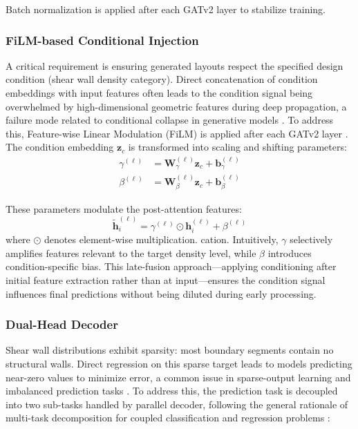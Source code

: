 Batch normalization is applied after each GATv2 layer to stabilize training.

\subsubsection{FiLM-based Conditional Injection}

A critical requirement is ensuring generated layouts respect the specified design condition (shear wall density category).
Direct concatenation of condition embeddings with input features often leads to the condition signal being overwhelmed by high-dimensional geometric features during deep propagation, a failure mode related to conditional collapse in generative models \cite{lucasUnderstandingPosteriorCollapse2019}. To address this, Feature-wise Linear Modulation (FiLM) is applied after each GATv2 layer \cite{perezFiLMVisualReasoning2018}.
The condition embedding $\mathbf{z}_c$ is transformed into scaling and shifting parameters:
\begin{align}
\gamma^{(\ell)} &= \mathbf{W}_\gamma^{(\ell)} \mathbf{z}_c + \mathbf{b}_\gamma^{(\ell)} \\
\beta^{(\ell)} &= \mathbf{W}_\beta^{(\ell)} \mathbf{z}_c + \mathbf{b}_\beta^{(\ell)}
\end{align}

These parameters modulate the post-attention features:
\begin{equation}
\tilde{\mathbf{h}}_i^{(\ell)} = \gamma^{(\ell)} \odot \mathbf{h}_i^{(\ell)} + \beta^{(\ell)}
\label{eq:method_film}
\end{equation}
where $\odot$ denotes element-wise multiplication.
cation.
Intuitively, $\gamma$ selectively amplifies features relevant to the target density level, while $\beta$ introduces condition-specific bias.
This late-fusion approach---applying conditioning after initial feature extraction rather than at input---ensures the condition signal influences final predictions without being diluted during early processing.

\subsubsection{Dual-Head Decoder}

Shear wall distributions exhibit sparsity: most boundary segments contain no structural walls.
Direct regression on this sparse target leads to models predicting near-zero values to minimize error, a common issue in sparse-output learning and imbalanced prediction tasks \cite{johnsonSurveyDeepLearning2019}. To address this, the prediction task is decoupled into two sub-tasks handled by parallel decoder, following the general rationale of multi-task decomposition for coupled classification and regression problems \cite{crawshawMultitaskLearningDeep2020,ottJointClassificationTrajectory2022}:

